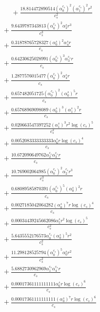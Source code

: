 \documentclass[10pt]{article}
\begin{document}
\begin{align*}
\phantom{R_{0,8}} &\phantom{={}}{}  + \frac{18.814472890514 \left(\alpha_{0}^{c_s}\right)^{2} \left(\alpha_{1}^{c_s}\right)^{2} r^{2}}{c_{s}^{2}} \\
&{}  + \frac{9.6439787343813 \left(\alpha_{0}^{c_s}\right)^{2} \alpha_{2}^s r^{3}}{c_{s}^{3}} \\
&{}  + \frac{0.31878765728327 \left(\alpha_{0}^s\right)^{2} \alpha_{4}^s r}{c_{s}} \\
&{}  + \frac{0.64230625028991 \left(\alpha_{0}^{c_s}\right)^{3} \alpha_{3}^{c_s} r}{c_{s}} \\
&{}  + \frac{1.2877576015477 \left(\alpha_{0}^{c_s}\right)^{2} \alpha_{4}^s r}{c_{s}} \\
&{}  + \frac{0.657482051725 \left(\alpha_{0}^{c_s}\right)^{2} \left(\alpha_{0}^s\right)^{5} r}{c_{s}} \\
&{}  + \frac{0.65768969098089 \left(\alpha_{0}^s\right)^{3} \left(\alpha_{1}^s\right)^{2} r}{c_{s}} \\
&{}  + \frac{0.020663547397252 \left(\alpha_{1}^s\right)^{3} r^{2} \log{\left(c_{s} \right)}^{5}}{c_{s}^{2}} \\
&{}  + \frac{0.0052083333333333 \alpha_{6}^s r \log{\left(c_{s} \right)}^{4}}{c_{s}} \\
&{}  + \frac{10.672090649762 \alpha_{2}^{c_s} \alpha_{3}^{c_s} r}{c_{s}} \\
&{}  + \frac{10.769002064985 \left(\alpha_{0}^{c_s}\right)^{2} \alpha_{2}^{c_s} r^{3}}{c_{s}^{3}} \\
&{}  + \frac{0.68089585870391 \left(\alpha_{0}^{c_s}\right)^{5} \left(\alpha_{0}^s\right)^{2} r}{c_{s}} \\
&{}  + \frac{0.0027185042064282 \left(\alpha_{0}^s\right)^{7} r \log{\left(c_{s} \right)}^{4}}{c_{s}} \\
&{}  + \frac{0.00034439245662086 \alpha_{5}^s r^{2} \log{\left(c_{s} \right)}^{5}}{c_{s}^{2}} \\
&{}  + \frac{5.6435552176573 \alpha_{0}^{c_s} \left(\alpha_{0}^s\right)^{5} r^{2}}{c_{s}^{2}} \\
&{}  + \frac{11.298128525794 \left(\alpha_{0}^{c_s}\right)^{5} \alpha_{0}^s r^{2}}{c_{s}^{2}} \\
&{}  + \frac{5.6882730962969 \alpha_{1}^{c_s} \alpha_{4}^{c_s} r}{c_{s}} \\
&{}  + \frac{0.00017361111111111 \alpha_{6}^s r \log{\left(c_{s} \right)}^{6}}{c_{s}} \\
&{}  + \frac{0.00017361111111111 \left(\alpha_{0}^s\right)^{7} r \log{\left(c_{s} \right)}^{6}}{c_{s}} \\

\end{align*}
\end{document}
